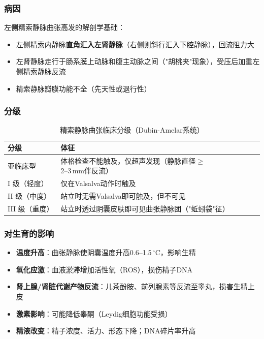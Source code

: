 \subsubsection{病因}

左侧精索静脉曲张高发的解剖学基础：
\begin{itemize}[leftmargin=2cm]
	\item 左侧精索内静脉\textbf{直角汇入左肾静脉}（右侧则斜行汇入下腔静脉），回流阻力大
	\item 左肾静脉走行于肠系膜上动脉和腹主动脉之间（"胡桃夹"现象），受压后加重左侧精索静脉反流
	\item 精索静脉瓣膜功能不全（先天性或退行性）
\end{itemize}

\subsubsection{分级}

\begin{table}[htbp]
\centering
\caption{精索静脉曲张临床分级（Dubin-Amelar系统）}
\label{tab:varicocele_grade}
\begin{tabularx}{\textwidth}{@{}lX@{}}
    \toprule
    \textbf{分级} & \textbf{体征} \\
    \midrule
    亚临床型 & 体格检查不能触及，仅超声发现（静脉直径$\ge$2--3\,mm伴反流） \\
    I 级（轻度） & 仅在Valsalva动作时触及 \\
    II 级（中度） & 站立时无需Valsalva即可触及，但不可见 \\
    III 级（重度） & 站立时透过阴囊皮肤即可见曲张静脉团（"蚯蚓袋"征） \\
    \bottomrule
\end{tabularx}
\end{table}

\subsubsection{对生育的影响}

\begin{itemize}[leftmargin=2cm]
	\item \textbf{温度升高}：曲张静脉使阴囊温度升高0.6--1.5\,$^\circ$C，影响生精
	\item \textbf{氧化应激}：血液淤滞增加活性氧（ROS），损伤精子DNA
	\item \textbf{肾上腺/肾脏代谢产物反流}：儿茶酚胺、前列腺素等反流至睾丸，损害生精上皮
	\item \textbf{激素影响}：可能降低睾酮（Leydig细胞功能受损）
	\item \textbf{精液改变}：精子浓度、活力、形态下降；DNA碎片率升高
\end{itemize}

